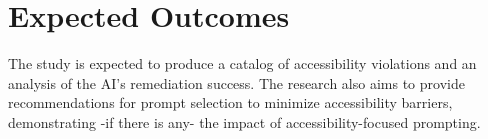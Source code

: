 \documentclass{article}
\begin{document}
\section{Expected Outcomes}
The study is expected to produce a catalog of accessibility violations and an analysis of the AI's remediation success.
The research also aims to provide recommendations for prompt selection to minimize accessibility barriers,
demonstrating -if there is any- the impact of accessibility-focused prompting.

\pagebreak



\end{document}

